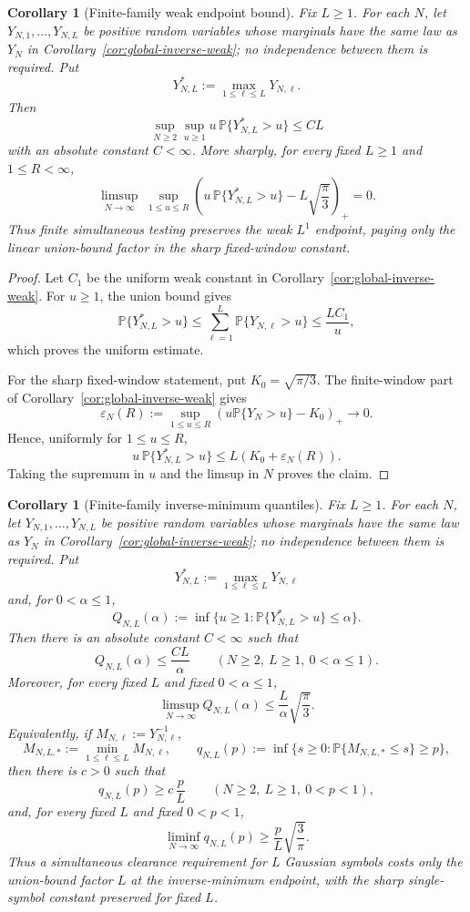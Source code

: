 \documentclass[11pt]{amsart}
\numberwithin{equation}{section}
\newtheorem{corollary}[theorem]{Corollary}
\theoremstyle{definition}
\theoremstyle{remark}
\newcommand{\Prob}{\mathbb P}
\begin{document}
\begin{corollary}[Finite-family weak endpoint bound]
\label{cor:global-inverse-family-weak}
Fix \(L\ge1\).  For each \(N\), let
\(Y_{N,1},\ldots,Y_{N,L}\) be positive random variables whose marginals have the
same law as \(Y_N\) in Corollary~\ref{cor:global-inverse-weak}; no independence
between them is required.  Put
\[
  Y_{N,L}^*:=\max_{1\le\ell\le L}Y_{N,\ell}.
\]
Then
\[
  \sup_{N\ge2}\sup_{u\ge1}
  u\,\Prob\{Y_{N,L}^*>u\}\le C L
\]
with an absolute constant \(C<\infty\).  More sharply, for every fixed
\(L\ge1\) and \(1\le R<\infty\),
\[
  \limsup_{N\to\infty}\;
  \sup_{1\le u\le R}
  \left(
    u\,\Prob\{Y_{N,L}^*>u\}
    -L\sqrt{\frac{\pi}{3}}
  \right)_+
  =0 .
\]
Thus finite simultaneous testing preserves the weak \(L^1\) endpoint, paying
only the linear union-bound factor in the sharp fixed-window constant.
\end{corollary}

\begin{proof}
Let \(C_1\) be the uniform weak constant in
Corollary~\ref{cor:global-inverse-weak}.  For \(u\ge1\), the union bound gives
\[
  \Prob\{Y_{N,L}^*>u\}
  \le \sum_{\ell=1}^L\Prob\{Y_{N,\ell}>u\}
  \le \frac{LC_1}{u},
\]
which proves the uniform estimate.

For the sharp fixed-window statement, put \(K_0=\sqrt{\pi/3}\).  The
finite-window part of Corollary~\ref{cor:global-inverse-weak} gives
\[
  \varepsilon_N(R):=
  \sup_{1\le u\le R}
  \left(u\Prob\{Y_N>u\}-K_0\right)_+
  \longrightarrow0 .
\]
Hence, uniformly for \(1\le u\le R\),
\[
  u\,\Prob\{Y_{N,L}^*>u\}
  \le L\left(K_0+\varepsilon_N(R)\right).
\]
Taking the supremum in \(u\) and the limsup in \(N\) proves the claim.
\end{proof}

\begin{corollary}[Finite-family inverse-minimum quantiles]
\label{cor:global-inverse-family-quantiles}
Fix \(L\ge1\).  For each \(N\), let
\(Y_{N,1},\ldots,Y_{N,L}\) be positive random variables whose marginals have the
same law as \(Y_N\) in Corollary~\ref{cor:global-inverse-weak}; no independence
between them is required.  Put
\[
  Y_{N,L}^*:=\max_{1\le \ell\le L}Y_{N,\ell}
\]
and, for \(0<\alpha\le1\),
\[
  Q_{N,L}(\alpha):=\inf\{u\ge1:\Prob\{Y_{N,L}^*>u\}\le\alpha\}.
\]
Then there is an absolute constant \(C<\infty\) such that
\[
  Q_{N,L}(\alpha)\le \frac{CL}{\alpha}
  \qquad(N\ge2,\ L\ge1,\ 0<\alpha\le1).
\]
Moreover, for every fixed \(L\) and fixed \(0<\alpha\le1\),
\[
  \limsup_{N\to\infty} Q_{N,L}(\alpha)
  \le \frac{L}{\alpha}\sqrt{\frac{\pi}{3}}.
\]
Equivalently, if \(M_{N,\ell}:=Y_{N,\ell}^{-1}\),
\[
  M_{N,L,*}:=\min_{1\le\ell\le L}M_{N,\ell},
  \qquad
  q_{N,L}(p):=\inf\{s\ge0:\Prob\{M_{N,L,*}\le s\}\ge p\},
\]
then there is \(c>0\) such that
\[
  q_{N,L}(p)\ge c\,\frac{p}{L}
  \qquad(N\ge2,\ L\ge1,\ 0<p<1),
\]
and, for every fixed \(L\) and fixed \(0<p<1\),
\[
  \liminf_{N\to\infty}q_{N,L}(p)
  \ge \frac{p}{L}\sqrt{\frac{3}{\pi}}.
\]
Thus a simultaneous clearance requirement for \(L\) Gaussian symbols costs only
the union-bound factor \(L\) at the inverse-minimum endpoint, with the sharp
single-symbol constant preserved for fixed \(L\).
\end{corollary}
\end{document}
